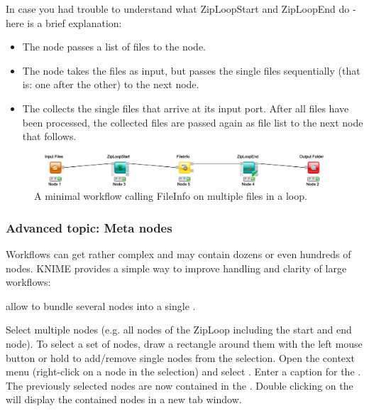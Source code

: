 In case you had trouble to understand what ZipLoopStart and ZipLoopEnd do - here is a brief explanation:
\begin{itemize}
\item
The   node passes a list of files to the  node.
\item
The  node takes the files as input, but passes the single files sequentially (that is: one after the other) to the next node. 
\item
The  collects the single files that arrive at its input port. After all files have been processed, the collected files are passed again as file list to the next node that follows.
\end{itemize}

\begin{figure}
\centering
\includegraphics[width=\textwidth]{graphics/knime_setup/Minimal_FileInfoLoop}
\caption{A minimal workflow calling FileInfo on multiple files in a loop.}
\label{fig:knime_minimal_loop}
\end{figure}

\subsubsection{Advanced topic: Meta nodes}

Workflows can get rather complex and may contain dozens or even hundreds of nodes. KNIME provides a simple way to improve handling and clarity of large workflows:

 allow to bundle several nodes into a single .

\begin{task}
Select multiple nodes (e.g. all nodes of the ZipLoop including the start and end node). To select a set of nodes, draw a rectangle around them with the left mouse button or hold  to add/remove single nodes from the selection. Open the context menu (right-click on a node in the selection) and select . Enter a caption for the . The previously selected nodes are now contained in the . Double clicking on the  will display the contained nodes in a new tab window. 
\end{task}

